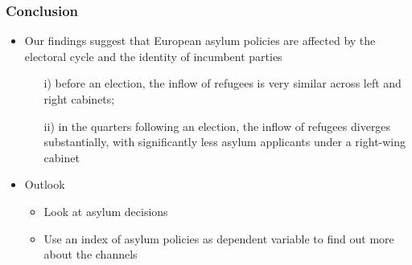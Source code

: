 \documentclass[compress, xcolor = {table,xcdraw}]{beamer}
\begin{document}
\begin{frame}
\frametitle{Conclusion}
\begin{itemize}
\item Our findings suggest that European asylum policies are affected by the electoral cycle and the identity of incumbent parties
\begin{itemize}
	\item[i)]before an election, the inflow of refugees is very similar across left and right cabinets;
	\item[ii)]in the quarters following an election, the inflow of refugees diverges substantially, with significantly less asylum applicants under a right-wing cabinet
\end{itemize}
\smallskip

\item Outlook
\begin{itemize}
	\item Look at asylum decisions
	\item Use an index of asylum policies as dependent variable to find out more about the channels
\end{itemize}
\end{itemize}
\end{frame}
\end{document}
